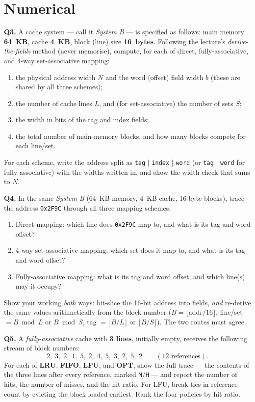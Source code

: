 \documentclass[11pt]{article}
\begin{document}
\section{Numerical}

\textbf{Q3.} A cache system --- call it \emph{System B} --- is specified as follows: main memory \textbf{64~KB}, cache \textbf{4~KB}, block (line) size \textbf{16~bytes}. Following the lecture's \emph{derive-the-fields} method (never memorise), compute, for each of direct, fully-associative, and 4-way set-associative mapping:
\begin{enumerate}
  \item[(a)] the physical address width $N$ and the word (offset) field width $b$ (these are shared by all three schemes);
  \item[(b)] the number of cache lines $L$, and (for set-associative) the number of sets $S$;
  \item[(c)] the width in bits of the tag and index fields;
  \item[(d)] the total number of main-memory blocks, and how many blocks compete for each line/set.
\end{enumerate}
For each scheme, write the address split as \texttt{tag} $\mid$ \texttt{index} $\mid$ \texttt{word} (or \texttt{tag} $\mid$ \texttt{word} for fully associative) with the widths written in, and show the width check that sums to $N$.

\textbf{Q4.} In the same \emph{System B} (64~KB memory, 4~KB cache, 16-byte blocks), trace the address \texttt{0x2F9C} through all three mapping schemes.
\begin{enumerate}
  \item[(a)] Direct mapping: which line does \texttt{0x2F9C} map to, and what is its tag and word offset?
  \item[(b)] 4-way set-associative mapping: which set does it map to, and what is its tag and word offset?
  \item[(c)] Fully-associative mapping: what is its tag and word offset, and which line(s) may it occupy?
\end{enumerate}
Show your working \emph{both} ways: bit-slice the 16-bit address into fields, \emph{and} re-derive the same values arithmetically from the block number ($B = \lfloor \text{addr}/16 \rfloor$, line/set $= B \bmod L$ or $B \bmod S$, tag $= \lfloor B/L \rfloor$ or $\lfloor B/S \rfloor$). The two routes must agree.

\textbf{Q5.} A \emph{fully-associative} cache with \textbf{3 lines}, initially empty, receives the following stream of block numbers:
\[
2,\;3,\;2,\;1,\;5,\;2,\;4,\;5,\;3,\;2,\;5,\;2
\qquad (12 \text{ references}).
\]
For each of \textbf{LRU}, \textbf{FIFO}, \textbf{LFU}, and \textbf{OPT}, show the full trace --- the contents of the three lines after every reference, marked \texttt{M}/\texttt{H} --- and report the number of hits, the number of misses, and the hit ratio. For LFU, break ties in reference count by evicting the block loaded earliest. Rank the four policies by hit ratio.
\end{document}
